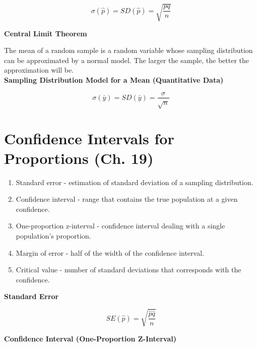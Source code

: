 \documentclass{article}
\theoremstyle{definition}
\begin{document}
\begin{equation}
    \sigma(\hat{p}) = SD(\hat{p}) = \sqrt{\frac{pq}{n}}
\end{equation}

\textbf{Central Limit Theorem}

The mean of a random sample is a random variable whose sampling distribution can be approximated by a normal model. The larger the sample, the better the approximation will be. \\

\textbf{Sampling Distribution Model for a Mean (Quantitative Data)}

\begin{equation}
    \sigma(\bar{y}) = SD(\bar{y}) = \frac{\sigma}{\sqrt{n}}
\end{equation}

\pagebreak

\section{Confidence Intervals for Proportions (Ch. 19)}

\begin{enumerate}[label=\textbf{\roman*.}]
    \item Standard error - estimation of standard deviation of a sampling distribution.

    \item Confidence interval - range that contains the true population at a given confidence.

    \item One-proportion z-interval - confidence interval dealing with a single population's proportion.

    \item Margin of error - half of the width of the confidence interval.

    \item Critical value - number of standard deviations that corresponds with the confidence.

\end{enumerate}

\vspace{2ex}
\textbf{Standard Error}

\begin{equation}
    SE(\hat{p}) = \sqrt{\frac{\hat{p}\hat{q}}{n}}
\end{equation}

\vspace{2ex}
\textbf{Confidence Interval (One-Proportion Z-Interval)}
\end{document}

